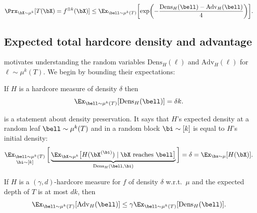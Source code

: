 \documentclass[11pt]{article}
\newcommand{\gnote}[1]{\footnote{{\bf \color{violet}Guy}: {#1}}}
\newcommand{\adv}{\mathrm{Adv}}
\newcommand{\Dens}{\mathrm{Dens}}
\newcommand{\Adv}{\mathrm{Adv}}
\DeclarePairedDelimiter\paren{(}{)}
\DeclarePairedDelimiter\bracket{[}{]}
\begin{document}
\begin{tcolorbox}[colback = white,arc=1mm, boxrule=0.25mm]
\begin{lemma}%
\label{lem:accuracy in terms of hardcore density and advantage}
\[ 
         \Prx_{\bX \sim \mu^k}[T(\bX) = f^{\otimes k}(\bX)] \leq \Ex_{\bell \sim \mu^k(T)}\bracket*{\exp\paren*{-\frac{\Dens_H(\bell) - \Adv_H(\bell)}{4}}}.
  \] 
\end{lemma} 
\end{tcolorbox}



\subsection{Expected total hardcore density and advantage}


 motivates understanding the random variables $\mathrm{Dens}_H(\boldsymbol{\ell})$ and $\mathrm{Adv}_H(\boldsymbol{\ell})$ for $\boldsymbol{\ell}\sim \mu^k(T)$. We begin by bounding their expectations:


\begin{claim}
\label{claim:expected total hardcore density} If $H$ is a hardcore measure of density $\delta$ then 
\[  \Ex_{\bell\sim \mu^k(T)}[\Dens_H(\bell)] = \delta k. \] 
\end{claim}


 is a statement about density preservation. It says that $H$'s expected density at a random leaf $\bell \sim \mu^k(T)$ and in a random block $\bi\sim [k]$ is equal to $H$'s initial density: 
\[  \mathop{\Ex_{\bell\sim \mu^k(T)}}_{\bi\sim [k]}\bigg[  \underbrace{\Ex_{\bX\sim \mu^k}\big[H(\bX^{(\bi)})\mid \text{$\bX$ reaches $\bell$}\big]}_{\Dens_H(\bell,\bi)}\bigg] = \delta = \Ex_{\bx\sim \mu}[H(\bX)]. \]
 

\begin{claim}
\label{claim:expected total hardcore advantage}
    If $H$ is a $(\gamma, d)$-hardcore measure for $f$ of density $\delta$ w.r.t.~$\mu$ and the expected depth of $T$ is at most $dk$, then 
    \begin{equation*}
        \Ex_{\bell \sim \mu^k(T)}[\adv_H(\bell)] \leq \gamma \Ex_{\bell\sim\mu^k(T)}[\Dens_H(\bell)]. 
    \end{equation*}
\end{claim}
\end{document}
